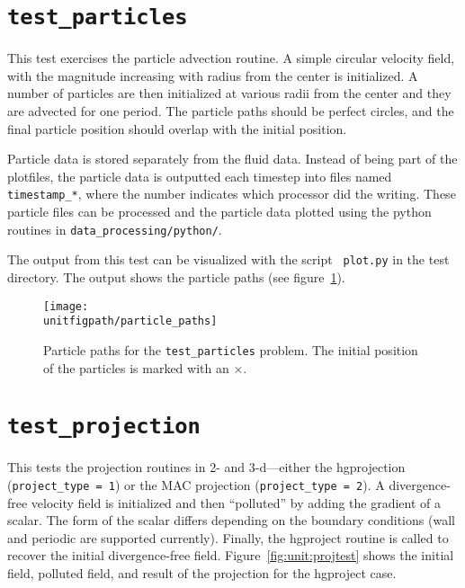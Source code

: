 \section {\tt test\_particles}

  This test exercises the particle advection routine.  A simple
  circular velocity field, with the magnitude increasing with radius
  from the center is initialized.  A number of particles are then
  initialized at various radii from the center and they are advected
  for one period.  The particle paths should be perfect circles, and
  the final particle position should overlap with the initial
  position.

  Particle data is stored separately from the fluid data.  Instead
  of being part of the plotfiles, the particle data is outputted
  each timestep into files named {\tt timestamp\_*}, where 
  the number indicates which processor did the writing.  These
  particle files can be processed and the particle data plotted
  using the python routines in {\tt data\_processing/python/}.

  The output from this test can be visualized with the script {\tt
  plot.py} in the test directory.  The output shows the particle
  paths (see figure~\ref{fig:unit:particles}).

\begin{figure}[t] 
\centering
\texttt{[image: \\unitfigpath/particle\_paths]} 
%
\caption[Particle paths for the {\tt test\_particles} problem]{\label{fig:unit:particles}
  Particle paths for the {\tt test\_particles} problem.  The initial
  position of the particles is marked with an $\times$.}
\end{figure}


\section {\tt test\_projection}

  This tests the projection routines in 2- and 3-d---either the hgprojection
  ({\tt project\_type = 1}) or the MAC projection ({\tt project\_type =
  2}).  A divergence-free velocity field is initialized and then
  ``polluted'' by adding the gradient of a scalar.  The form of the
  scalar differs depending on the boundary conditions (wall and
  periodic are supported currently).  Finally, the hgproject routine
  is called to recover the initial divergence-free field.
  Figure~\ref{fig:unit:projtest} shows the initial field, polluted
  field, and result of the projection for the hgproject case.

